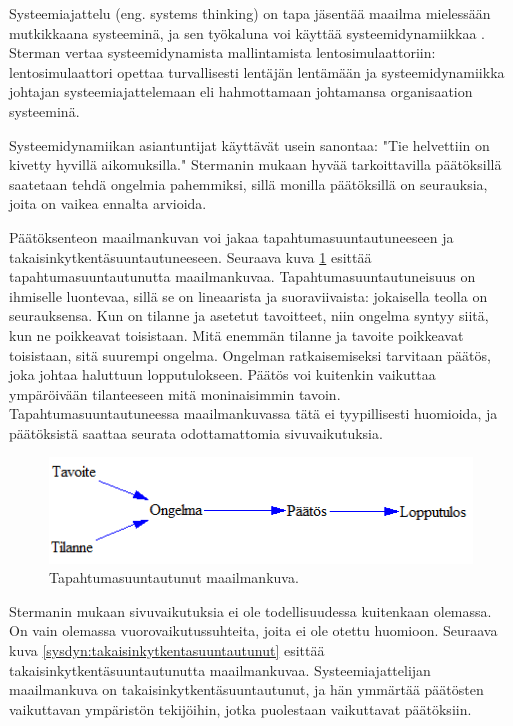 \documentclass[finnish,12pt,a4paper,pdftex]{article}
\begin{document}
\begin{onehalfspacing}
Systeemiajattelu (eng. systems thinking) on tapa jäsentää maailma mielessään mutkikkaana systeeminä, ja sen työkaluna voi käyttää systeemidynamiikkaa \cite[s. 4--5]{Sterman2000}. Sterman \cite[s. 4--5]{Sterman2000} vertaa systeemidynamista mallintamista lentosimulaattoriin: lentosimulaattori opettaa turvallisesti lentäjän lentämään ja systeemidynamiikka johtajan systeemiajattelemaan eli hahmottamaan johtamansa organisaation systeeminä. 

Systeemidynamiikan asiantuntijat käyttävät usein sanontaa: "Tie helvettiin on kivetty hyvillä aikomuksilla." Stermanin \cite[s. 5--6]{Sterman2000} mukaan hyvää tarkoittavilla päätöksillä saatetaan tehdä ongelmia pahemmiksi, sillä monilla päätöksillä on seurauksia, joita on vaikea ennalta arvioida. %

Päätöksenteon maailmankuvan voi jakaa tapahtumasuuntautuneeseen ja takaisinkytkentäsuuntautuneeseen. Seuraava kuva \ref{sysdyn:tapahtumasuuntautunut} esittää tapahtumasuuntautunutta maailmankuvaa. Tapahtumasuuntautuneisuus on ihmiselle luontevaa, sillä se on lineaarista ja suoraviivaista: jokaisella teolla on seurauksensa. Kun on tilanne ja asetetut tavoitteet, niin ongelma syntyy siitä, kun ne poikkeavat toisistaan. Mitä enemmän tilanne ja tavoite poikkeavat toisistaan, sitä suurempi ongelma. Ongelman ratkaisemiseksi tarvitaan päätös, joka johtaa haluttuun lopputulokseen. Päätös voi kuitenkin vaikuttaa ympäröivään tilanteeseen mitä moninaisimmin tavoin. Tapahtumasuuntautuneessa maailmankuvassa tätä ei tyypillisesti huomioida, ja päätöksistä saattaa seurata odottamattomia sivuvaikutuksia. \cite[s. 10]{Sterman2000}

\begin{figure}[H]
\centering \includegraphics{tapahtuma}
\caption{Tapahtumasuuntautunut maailmankuva. \cite[s. 10]{Sterman2000} \label{sysdyn:tapahtumasuuntautunut}}
\end{figure}

Stermanin \cite[s. 11]{Sterman2000} mukaan sivuvaikutuksia ei ole todellisuudessa kuitenkaan olemassa. On vain olemassa vuorovaikutussuhteita, joita ei ole otettu huomioon. Seuraava kuva \ref{sysdyn:takaisinkytkentasuuntautunut} esittää takaisinkytkentäsuuntautunutta maailmankuvaa. Systeemiajattelijan maailmankuva on takaisinkytkentäsuuntautunut, ja hän ymmärtää päätösten vaikuttavan ympäristön tekijöihin, jotka puolestaan vaikuttavat päätöksiin. 


\end{onehalfspacing}
\end{document}
